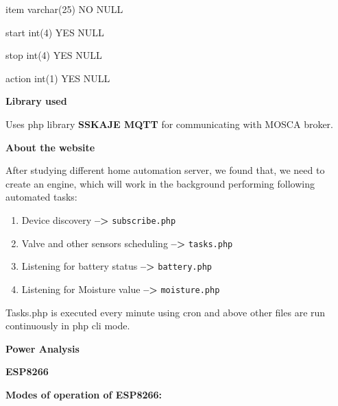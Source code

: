 \documentclass[16pt]{article}
\begin{document}
item \textbar{} varchar(25) \textbar{} NO \textbar{} \textbar{} NULL
\textbar{} \textbar{}

start \textbar{} int(4) \textbar{} YES \textbar{} \textbar{} NULL
\textbar{} \textbar{}

stop \textbar{} int(4) \textbar{} YES \textbar{} \textbar{} NULL
\textbar{} \textbar{}

action \textbar{} int(1) \textbar{} YES \textbar{} \textbar{} NULL
\textbar{}


\textbf{Library used}

Uses php library \textbf{SSKAJE MQTT} for communicating with MOSCA
broker.



\textbf{About the website}

After studying different home automation server, we found that, we need
to create an engine, which will work in the background performing
following automated tasks:

\begin{enumerate}

\item Device discovery \textbf{--\textgreater{}}
\texttt{subscribe.php}
\item Valve and other sensors scheduling
\textbf{--\textgreater{}} \texttt{tasks.php} 
\item Listening for battery status \textbf{--\textgreater{}} \texttt{battery.php} 
\item Listening for Moisture value \textbf{--\textgreater{}} \texttt{moisture.php}

\end{enumerate}


Tasks.php is executed every minute using cron and above other files are
run continuously in php cli mode.

\vspace{13cm}

{\LARGE{\textbf{Power Analysis}}}
\vspace{0.5cm}

{\Large{\textbf{ESP8266}}}

\vspace{0.2cm}

\textbf{Modes of operation of
ESP8266:}
\end{document}
